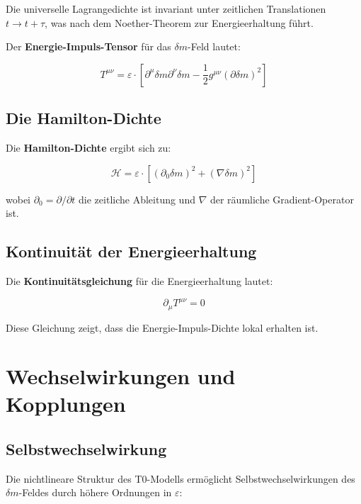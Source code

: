 \documentclass[12pt,a4paper]{report}
\begin{document}
	Die universelle Lagrangedichte ist invariant unter zeitlichen Translationen $t \to t + \tau$, was nach dem Noether-Theorem zur Energieerhaltung führt.
	
	Der \textbf{Energie-Impuls-Tensor} für das $\delta m$-Feld lautet:
	
	\begin{equation}
		T^{\mu\nu} = \varepsilon \cdot [\partial^\mu\delta m \partial^\nu\delta m - \frac{1}{2}g^{\mu\nu} (\partial\delta m)^2]
	\end{equation}
	
	\subsection{Die Hamilton-Dichte}
	
	Die \textbf{Hamilton-Dichte} ergibt sich zu:
	
	\begin{equation}
		\mathcal{H} = \varepsilon \cdot [(\partial_0\delta m)^2 + (\nabla\delta m)^2]
	\end{equation}
	
	wobei $\partial_0 = \partial/\partial t$ die zeitliche Ableitung und $\nabla$ der räumliche Gradient-Operator ist.
	
	\subsection{Kontinuität der Energieerhaltung}
	
	Die \textbf{Kontinuitätsgleichung} für die Energieerhaltung lautet:
	
	\begin{equation}
		\partial_\mu T^{\mu\nu} = 0
	\end{equation}
	
	Diese Gleichung zeigt, dass die Energie-Impuls-Dichte lokal erhalten ist.
	
	\section{Wechselwirkungen und Kopplungen}
	
	\subsection{Selbstwechselwirkung}
	
	Die nichtlineare Struktur des T0-Modells ermöglicht Selbstwechselwirkungen des $\delta m$-Feldes durch höhere Ordnungen in $\varepsilon$:
	
\end{document}
